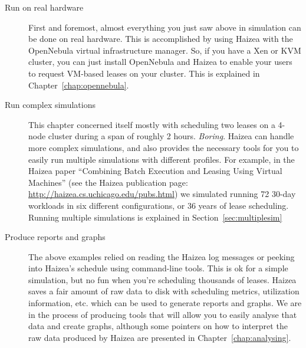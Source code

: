 \begin{description}
\item[Run on real hardware] First and foremost, almost everything you just saw above in simulation can be done on real hardware. This is accomplished by using Haizea with the OpenNebula virtual infrastructure manager. So, if you have a Xen or KVM cluster, you can just install OpenNebula and Haizea to enable your users to request VM-based leases on your cluster. This is explained in Chapter~\ref{chap:opennebula}.
\item[Run complex simulations] This chapter concerned itself mostly with scheduling two leases on a 4-node cluster during a span of roughly 2 hours. \emph{Boring}. Haizea can handle more complex simulations, and also provides the necessary tools for you to easily run multiple simulations with different profiles. For example, in the Haizea paper ``Combining Batch Execution and Leasing Using Virtual Machines'' (see the Haizea publication page: \url{http://haizea.cs.uchicago.edu/pubs.html}) we simulated running 72 30-day workloads in six different configurations, or 36 years of lease scheduling. Running multiple simulations is explained in Section~\ref{sec:multiplesim}
\item[Produce reports and graphs] The above examples relied on reading the Haizea log messages or peeking into Haizea's schedule using command-line tools. This is ok for a simple simulation, but no fun when you're scheduling thousands of leases. Haizea saves a fair amount of raw data to disk with scheduling metrics, utilization information, etc. which can be used to generate reports and graphs. We are in the process of producing tools that will allow you to easily analyse that data and create graphs, although some pointers on how to interpret the raw data produced by Haizea are presented in Chapter~\ref{chap:analysing}.
\end{description}